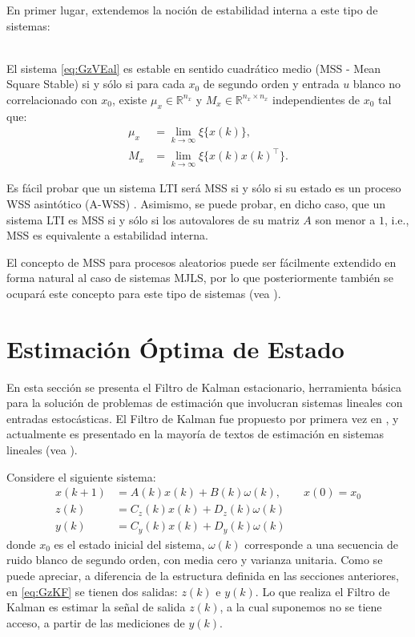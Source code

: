 En primer lugar, extendemos la noci\'on de estabilidad interna a este tipo de sistemas:

\begin{defin}\label{lema:mss}{\ \\}
El sistema \eqref{eq:GzVEal} es estable en sentido cuadr\'atico medio (MSS - Mean Square Stable) si y s\'olo si para cada $x_0$ de segundo orden y entrada $u$ blanco no correlacionado con $x_0$, existe $\mu_x \in \mathbb{R}^{n_x}$ y $M_x \in \mathbb{R}^{n_x \times n_x}$ independientes de $x_0$ tal que:
\begin{align*}
\mu_x &= \lim_{k\rightarrow \infty}{\xi\{ x(k)\}},\\
M_x &= \lim_{k\rightarrow \infty}{\xi \{ x(k)x(k)^{\intercal}\}}.
\end{align*}\QED
\end{defin}
Es f\'acil probar que un sistema LTI ser\'a MSS si y s\'olo si su estado es un proceso WSS asintótico (A-WSS) \cite{astrom70}. Asimismo, se puede probar, en dicho caso, que un sistema LTI es MSS si y s\'olo si los autovalores de su matriz $A$ son menor a $1$, i.e., MSS es equivalente a estabilidad interna.

\begin{obs}
El concepto de MSS para procesos aleatorios puede ser f\'acilmente extendido en forma natural al caso de sistemas MJLS, por lo que posteriormente tambi\'en se ocupar\'a este concepto para este tipo de sistemas (vea \cite{cofrma05}).
\end{obs}

\section{Estimaci\'on \'Optima de Estado}\label{sec:KF}
En esta secci\'on se presenta el Filtro de Kalman estacionario, herramienta b\'asica para la soluci\'on de problemas de estimaci\'on que involucran sistemas lineales con entradas estoc\'asticas. El Filtro de Kalman fue propuesto por primera vez en \cite{kalman1960new}, y actualmente es presentado en la mayor\'ia de textos de estimaci\'on en sistemas lineales (vea \cite{andmoo79,kwasiv72,soders02}).

Considere el siguiente sistema:
\begin{subequations}\label{eq:GzKF}
\begin{align}
x(k+1)&=A(k)x(k)+B(k)\omega(k),\qquad x(0)=x_0\\
z(k)&=C_z(k)x(k)+D_z(k)\omega(k)\\
y(k)&=C_y(k)x(k)+D_y(k)\omega(k)
\end{align}
\end{subequations}
donde $x_0$ es el estado inicial del sistema, $\omega(k)$ corresponde a una secuencia de ruido blanco de segundo orden, con media cero y varianza unitaria. Como se puede apreciar, a diferencia de la estructura definida en las secciones anteriores, en \eqref{eq:GzKF} se tienen dos salidas: $z(k)$ e $y(k)$. Lo que realiza el Filtro de Kalman es estimar la se\~nal de salida $z(k)$, a la cual suponemos no se tiene acceso, a partir de las mediciones de $y(k)$.

